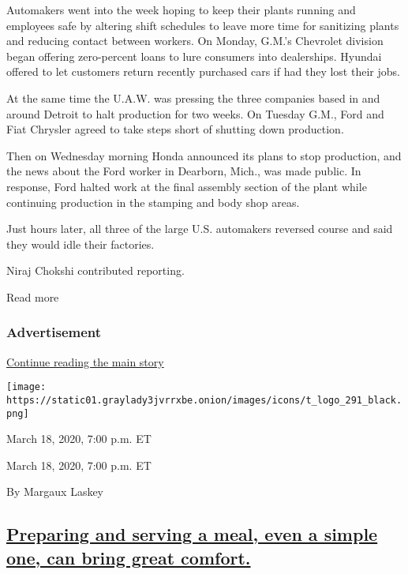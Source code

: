 Automakers went into the week hoping to keep their plants running and
employees safe by altering shift schedules to leave more time for
sanitizing plants and reducing contact between workers. On Monday,
G.M.'s Chevrolet division began offering zero-percent loans to lure
consumers into dealerships. Hyundai offered to let customers return
recently purchased cars if had they lost their jobs.

At the same time the U.A.W. was pressing the three companies based in
and around Detroit to halt production for two weeks. On Tuesday G.M.,
Ford and Fiat Chrysler agreed to take steps short of shutting down
production.

Then on Wednesday morning Honda announced its plans to stop production,
and the news about the Ford worker in Dearborn, Mich., was made public.
In response, Ford halted work at the final assembly section of the plant
while continuing production in the stamping and body shop areas.

Just hours later, all three of the large U.S. automakers reversed course
and said they would idle their factories.

Niraj Chokshi contributed reporting.

Read more

\hypertarget{advertisement-1}{%
\subsubsection{Advertisement}\label{advertisement-1}}

\protect\hyperlink{after-dfp-ad-mid2}{Continue reading the main story}

\texttt{[image: https://static01.graylady3jvrrxbe.onion/images/icons/t\_logo\_291\_black.png]}

March 18, 2020, 7:00 p.m. ET

March 18, 2020, 7:00 p.m. ET

By Margaux Laskey

\hypertarget{preparing-and-serving-a-meal-even-a-simple-one-can-bring-great-comfort}{%
\subsection{\texorpdfstring{\protect\hyperlink{preparing-and-serving-a-meal-even-a-simple-one-can-bring-great-comfort}{Preparing
and serving a meal, even a simple one, can bring great
comfort.}}{Preparing and serving a meal, even a simple one, can bring great comfort.}}\label{preparing-and-serving-a-meal-even-a-simple-one-can-bring-great-comfort}}

